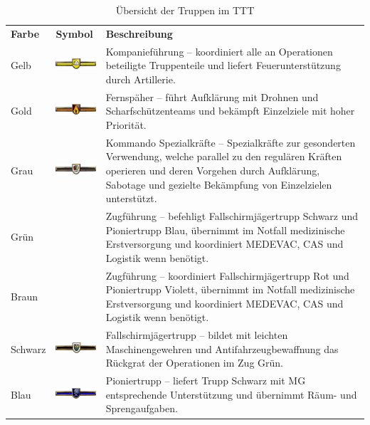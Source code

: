 \begin{longtable}{| >{\columncolor{backcolor}}l |p{3cm} | p{10cm} |} 
	\caption[Truppübersicht]{Übersicht der Truppen im TTT} \\
	\hline
	\textbf{Farbe} & \textbf{Symbol} & \textbf{Beschreibung} \\
	Gelb & \includegraphics [width=20mm]{./Grafiken/Abschnitt/TrGelb} & Kompanieführung -- koordiniert alle an Operationen beteiligte Truppenteile und liefert Feuerunterstützung durch Artillerie. \\
	\hline
	Gold & \includegraphics[width=20mm]{./Grafiken/Abschnitt/TrGold} & Fernspäher -- führt Aufklärung mit Drohnen und Scharfschützenteams und bekämpft Einzelziele mit hoher Priorität.\\
	\hline
	Grau & \includegraphics[width=20mm]{./Grafiken/Abschnitt/TrGrau} & Kommando Spezialkräfte -- Spezialkräfte zur gesonderten Verwendung, welche parallel zu den regulären Kräften operieren und deren Vorgehen durch Aufklärung, Sabotage und gezielte Bekämpfung von Einzelzielen unterstützt. \\
	\hline
	Grün &  & Zugführung -- befehligt Fallschirmjägertrupp Schwarz und Pioniertrupp Blau, übernimmt im Notfall medizinische Erstversorgung und koordiniert MEDEVAC, CAS und Logistik wenn benötigt. \\
	\hline
	Braun &   &Zugführung -- koordiniert Fallschirmjägertrupp Rot und Pioniertrupp Violett, übernimmt im Notfall medizinische Erstversorgung und koordiniert MEDEVAC, CAS und Logistik wenn benötigt. \\
	\hline
	Schwarz & \includegraphics[width=20mm]{./Grafiken/Abschnitt/TrSchwarz} &Fallschirmjägertrupp -- bildet mit leichten Maschinengewehren und Antifahrzeugbewaffnung das Rückgrat der Operationen im Zug Grün. \\
	\hline
	Blau & \includegraphics[width=20mm]{./Grafiken/Abschnitt/TrBlau} & Pioniertrupp -- liefert Trupp Schwarz mit MG entsprechende Unterstützung und übernimmt Räum- und Sprengaufgaben.\\

\end{longtable}
